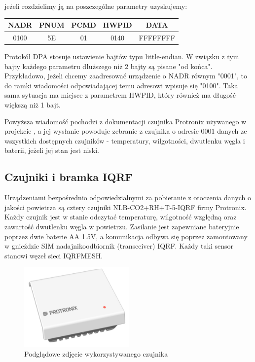 \documentclass[a4paper, 12pt]{article}
\begin{document}
jeżeli rozdzielimy ją na poszczególne parametry uzyskujemy:

\begin{table}[h]
    \centering
    \begin{tabular}{|c|c|c|c|c|}
    \hline
    NADR & PNUM & PCMD & HWPID & DATA \\ \hline
    0100 & 5E & 01 & 0140 & FFFFFFFF \\ \hline
    \end{tabular}
\end{table}

Protokół DPA stosuje ustawienie bajtów typu little-endian. W związku z tym bajty każdego parametru dłuższego
niż 2 bajty są pisane "od końca". Przykładowo, jeżeli chcemy zaadresować urządzenie o NADR równym "0001", to 
do ramki wiadomości odpowiadającej temu adresowi wpisuje się "0100". Taka sama sytuacja ma miejsce z parametrem
HWPID, który również ma długość większą niż 1 bajt.

Powyższa wiadomość pochodzi z dokumentacji czujnika Protronix używanego w projekcie \cite{protronix-comms}, a jej 
wysłanie powoduje zebranie z czujnika o adresie 0001 danych ze wszystkich dostępnych czujników - temperatury, 
wilgotności, dwutlenku węgla i baterii, jeżeli jej stan jest niski.

\subsection{Czujniki i bramka IQRF}

Urządzeniami bezpośrednio odpowiedzialnymi za pobieranie z otoczenia danych o jakości powietrza są cztery czujniki NLB-CO2+RH+T-5-IQRF firmy
Protronix. Każdy czujnik jest w stanie odczytać temperaturę, wilgotność względną oraz zawartość dwutlenku węgla w powietrzu. Zasilanie jest zapewniane
bateryjnie poprzez dwie baterie AA 1.5V, a komunikacja odbywa się poprzez zamontowany w gnieździe SIM nadajnikoodbiornik (transceiver) IQRF. Każdy taki sensor stanowi węzeł sieci IQRFMESH.

\begin{figure}[H]
    \centering
    \includegraphics[width=0.5\textwidth]{zdj/NLB-CO2RHT-5-IQRF.jpg}
    \caption{Podglądowe zdjęcie wykorzystywanego czujnika \cite{protronix-product}}
\end{figure}
\end{document}
